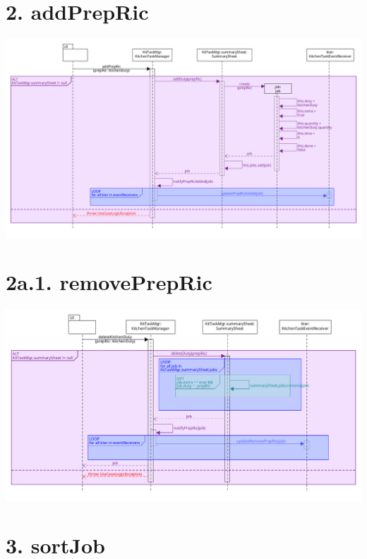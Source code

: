 \pagebreak

\section*{2. addPrepRic}

\begin{center}
  \includegraphics[scale = 0.32]{images/DSD/DSD 2.png}
\end{center}

\pagebreak

\section*{2a.1. removePrepRic}

\begin{center}
  \includegraphics[scale = 0.32]{images/DSD/DSD 2a.png}
\end{center}

\pagebreak

\section*{3. sortJob}

